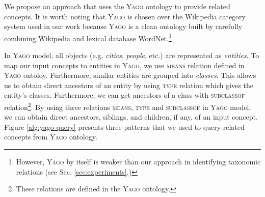 
We propose an approach that uses the \textsc{Yago} ontology
\cite{suchanek2007WWW} to provide related concepts. It is worth noting
that \textsc{Yago} is chosen over the Wikipedia category system used
in our work because \textsc{Yago} is a clean ontology built by
carefully combining Wikipedia and lexical database
WordNet.\footnote{However, \textsc{Yago} by itself is weaker than our
  approach in identifying taxonomic relations (see
  Sec. \ref{sec:experiments}.)}

In \textsc{Yago} model, all objects (e.g. {\em cities}, {\em people},
etc.)  are represented as {\em entities}. To map our input concepts to
entities in \textsc{Yago}, we use \textsc{means} relation defined in
\textsc{Yago} ontoloy. Furthermore, similar entities are grouped into
{\em classes}. This allows us to obtain direct ancestors of an entity
by using \textsc{type} relation which gives the entity's
classes. Furthermore, we can get ancestors of a class with
\textsc{subclassof} relation\footnote{These relations are defined in
  the \textsc{Yago} ontology.}. By using three relations
\textsc{means}, \textsc{type} and \textsc{subclassof} in \textsc{Yago}
model, we can obtain direct ancestors, siblings, and children, if any,
of an input concept. Figure \ref{alg:yago-query} presents three
patterns that we used to query related concepts from \textsc{Yago}
ontology. 


